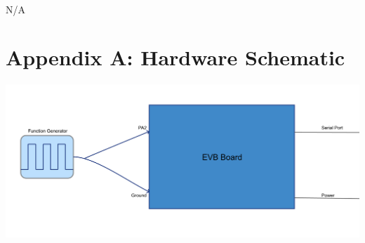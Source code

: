 \documentclass[12pt]{report}
\begin{document}
	\paragraph*{}
		N/A

\section*{Appendix A: Hardware Schematic}
	\begin{center}
	  \includegraphics[scale=.45]{HS.PNG}\\
	\end{center}
\end{document}
